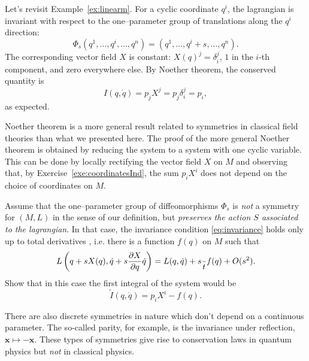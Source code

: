 \documentclass[english,fontsize=11pt,paper=a5,oneside]{scrbook}
\newcommand{\bx}{\bm{x}}
\let\d\relax
\DeclareMathOperator{\d}{d}
\theoremstyle{definition}
\newenvironment{remark}
  {\pushQED{\qed}\renewcommand{\qedsymbol}{$\lozenge$}\remarkx}
  {\popQED\endremarkx}
\newenvironment{example}
  {\pushQED{\qed}\renewcommand{\qedsymbol}{$\lozenge$}\examplex}
  {\popQED\endexamplex}
\newenvironment{exercise}
  {\pushQED{\qed}\renewcommand{\qedsymbol}{$\maltese$}\exercisex}
  {\popQED\endexercisex}
\begin{document}
\begin{example}[kinetic momentum - reprise]\label{exa:kmom}
    Let's revisit Example~\ref{ex:linearm}.
    For a cyclic coordinate $q^i$, the lagrangian is invariant with respect to the one--parameter group of translations along the $q^i$ direction:
    \begin{equation}
        \Phi_s(q^1, \ldots, q^i, \ldots, q^n) = (q^1, \ldots, q^i + s, \ldots, q^n).
    \end{equation}
    The corresponding vector field $X$ is constant: $X(q)^j = \delta^j_i$, $1$ in the $i$-th component, and zero everywhere else.
    By Noether theorem, the conserved quantity is
    \begin{equation}
        I(q,\dot q) = p_j X^j = p_j \delta^j_i = p_i,
    \end{equation}
    as expected.
\end{example}

\begin{remark}
    Noether theorem is a more general result related to symmetries in classical field theories than what we presented here.
    The proof of the more general Noether theorem is obtained by reducing the system to a system with one cyclic variable.
    This can be done by locally rectifying the vector field $X$ on $M$ and observing that, by Exercise~\ref{exe:coordinatesInd}, the sum $p_i X^i$ does not depend on the choice of coordinates on $M$.
\end{remark}

\begin{exercise}
    Assume that the one--parameter group of diffeomorphisms $\Phi_s$ is \emph{not} a symmetry for $(M,L)$ in the sense of our definition, but \emph{preserves the action $S$ associated to the lagrangian}.
    In that case, the invariance condition \eqref{eq:invariance} holds only up to total derivatives \cite[Chapter 4.20]{book:gelfand}, i.e. there is a function $f(q)$ on $M$ such that
    \begin{equation}
        L\left( q + s X(q), \dot q + s \frac{\partial X}{\partial q} \dot q\right)
        = L(q, \dot q) + s \frac{\d}{\d t}f(q) + O(s^2).
    \end{equation}
    Show that in this case the first integral of the system would be
    \begin{equation}
        \tilde I(q, \dot q) = p_i X^i - f(q).
    \end{equation}
\end{exercise}

\begin{remark}
    There are also discrete symmetries in nature which don't depend on a continuous parameter. The so-called parity, for example, is the invariance under reflection, $\bx \mapsto -\bx$.
    These types of symmetries give rise to conservation laws in quantum physics but \emph{not} in classical physics.
\end{remark}
\end{document}
